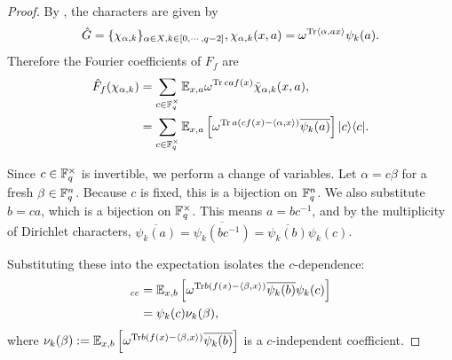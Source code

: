 \begin{proof}\leanok
    By , the characters are given by
    \[
    \hat{G} = \{\chi_{\alpha, k}\}_{\alpha \in X, k \in [0, \cdots, q-2]}, \chi_{\alpha, k}(x,a) = \omega^{{\rm Tr} \langle \alpha, a x \rangle} \psi_k(a).
    \]
    Therefore the Fourier coefficients of $F_f$ are
    \begin{align}
        \hat{F}_f(\chi_{\alpha, k}) 
        & = \sum_{c \in \mathbb{F}_q^\times } \mathbb{E}_{x, a} \omega^{{\rm Tr}\, c a f(x)} \bar{\chi}_{\alpha, k}(x, a) , \nonumber \\
        & = \sum_{c \in \mathbb{F}_q^\times }\mathbb{E}_{x,a} \left[ \omega^{{\rm Tr}\, a(cf(x) - \langle \alpha, x \rangle)} \overline{\psi_k(a)} \right] \mbox{$ | c \rangle $}\mbox{$ \langle c | $}.
    \end{align}
    

Since $c \in \mathbb{F}_q^\times$ is invertible, we perform a change of variables. Let $\alpha = c\beta$ for a fresh $\beta \in \mathbb{F}_q^n$. Because $c$ is fixed, this is a bijection on $\mathbb{F}_q^n$. 
We also substitute $b = ca$, which is a bijection on $\mathbb{F}_q^\times$. 
This means $a = bc^{-1}$, and by the multiplicity of Dirichlet characters, $\overline{\psi_k(a)} = \overline{\psi_k(bc^{-1})} = \overline{\psi_k(b)}\psi_k(c)$.

Substituting these into the expectation isolates the $c$-dependence: 
\begin{align} 
    [\hat{F}_f(\chi_{c\beta, k})]_{cc} &= \EE_{x,b} \left[ \omega^{\Tr b(f(x) - \langle \beta, x \rangle)} \overline{\psi_k(b)}\psi_k(c) \right] \nonumber \\
    &= \psi_k(c) \nu_k(\beta), 
\end{align}
where $\nu_k(\beta) := \mathbb{E}_{x,b} \left[ \omega^{{\rm Tr} b(f(x) - \langle \beta, x \rangle)} \overline{\psi_k(b)} \right]$ is a $c$-independent coefficient.    
\end{proof}



